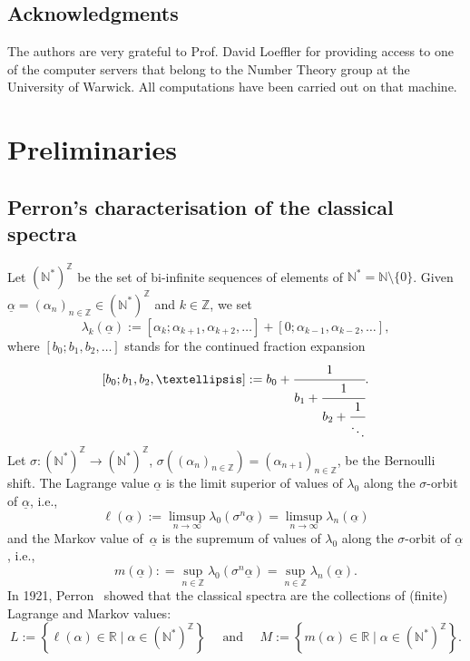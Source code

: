 \documentclass[10pt]{amsart}
\numberwithin{equation}{section}
\theoremstyle{definition}
\begin{document}

\subsection*{Acknowledgments} 
The authors are very grateful to Prof. David Loeffler for providing
access to one of the computer servers that belong to the Number
Theory group at the University of Warwick. All computations have been carried
out on that machine. 

\section{Preliminaries}\label{s.prelim}


\subsection{Perron's characterisation of the classical spectra} Let $(\mathbb N^*)^\mathbb Z$ be the set of bi-infinite sequences of elements of $\mathbb{N}^*=\mathbb{N}\setminus\{0\}$. Given $\underline{\alpha} = (\alpha_n)_{n\in\mathbb{Z}} \in (\mathbb N^*)^\mathbb Z$ and $k\in\mathbb{Z}$, we set 
$$\lambda_k(\underline{\alpha}):=[\alpha_k;\alpha_{k+1},\alpha_{k+2},\ldots]+[0;\alpha_{k-1},\alpha_{k-2},\ldots],$$ 
where $[b_0;b_1,b_2,\ldots]$ stands for the continued fraction expansion 
$$[b_0;b_1,b_2,\ldots]:=b_0+\cfrac{1}{b_{1}+\cfrac{1}{b_{2}+\cfrac{1}{\ddots}}}.$$ 
Let $\sigma:(\mathbb N^*)^{\mathbb Z}\to (\mathbb N^*)^\mathbb Z$, $\sigma( (\alpha_n)_{n \in \mathbb
Z} ) = (\alpha_{n+1})_{n\in \mathbb Z}$, be the Bernoulli shift. The Lagrange value $\underline{\alpha}$ is the
limit superior of values of $\lambda_0$ along the $\sigma$-orbit of $\underline{\alpha}$, i.e.,  
$$
\ell(\underline{\alpha}) := \limsup_{n\to \infty} \lambda_0(\sigma^n \underline{\alpha})
=\limsup_{n\to \infty} \lambda_n(\underline{\alpha})
$$
and the Markov value of~$\underline{\alpha}$ is the supremum of values of $\lambda_0$ along
the $\sigma$-orbit of $\underline{\alpha}$, i.e.,  
$$
m(\underline{\alpha}) : =  \sup_{n\in \mathbb Z} \lambda_0(\sigma^n \underline{\alpha}) =
\sup_{n\in \mathbb Z}\lambda_n(\underline{\alpha}).
$$ 
In 1921, Perron~\cite{Per21} showed that the classical spectra are the
collections of (finite) Lagrange and Markov values: 
\begin{equation}
    \label{eq:LMdef}
    L := \left\{ \ell(\alpha)\in\mathbb{R} \mid \alpha \in
    (\mathbb N^*)^\mathbb Z \right\} \quad \mbox{ and } \quad
    M := \left\{  m(\alpha)\in\mathbb{R} \mid \alpha \in (\mathbb N^*)^\mathbb Z \right\}. 
\end{equation}
\end{document}
